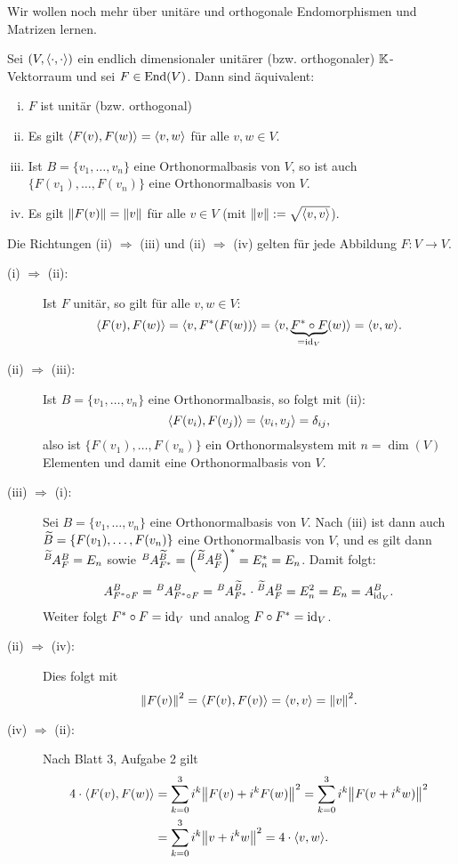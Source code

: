 Wir wollen noch mehr über unitäre und orthogonale Endomorphismen und Matrizen lernen.

\begin{satz}
	\label{satz:6.8}
	Sei $(V,\left\langle\cdot,\cdot\right\rangle)$ ein endlich dimensionaler unitärer (bzw. orthogonaler) $\mathbb{K}$-Vektorraum und sei $F \in \operatorname{End}(V)$.
	Dann sind äquivalent:
	\begin{enumerate}[(i)]
		\item $F$ ist unitär (bzw. orthogonal)
		\item Es gilt $\left\langle F(v),F(w)\right\rangle = \left\langle v,w\right\rangle$ für alle $v,w \in V$.
		\item Ist $B = \{v_1,\dots,v_n\}$ eine Orthonormalbasis von $V$, so ist auch $\{F(v_1),\dots,F(v_n)\}$ eine Orthonormalbasis von $V$.
		\item Es gilt $\left\lVert F(v)\right\rVert = \left\lVert v\right\rVert$ für alle $v \in V$ (mit $\left\lVert v\right\rVert := \sqrt{\left\langle v,v\right\rangle}$).
	\end{enumerate}
	Die Richtungen (ii) $\Rightarrow$ (iii) und (ii) $\Rightarrow$ (iv) gelten für jede Abbildung $F \colon V \rightarrow V$.
\end{satz}

\begin{beweis} 
	\begin{description}
		\item[(i) $\Rightarrow$ (ii):] Ist $F$ unitär, so gilt für alle $v,w \in V$:
		\[
			\sk{F(v),F(w)} = \sk{v,F^*(F(w))} = \langle v,\Underbrace{F^*\circ F}{\mathclap{=\id_V}}(w)\rangle = \sk{v,w}.
		\]
		\item[(ii) $\Rightarrow$ (iii):] Ist $B = \{v_1,\dots,v_n\}$ eine Orthonormalbasis, so folgt mit (ii):
		\[
			\left\langle F(v_i),F(v_j)\right\rangle = \left\langle v_i,v_j\right\rangle = \delta_{ij},
		\]
		also ist $\{F(v_1),\dots,F(v_n)\}$ ein Orthonormalsystem mit $n = \dim(V)$ Elementen und damit eine Orthonormalbasis von $V$.
		\item[(iii) $\Rightarrow$ (i):] Sei $B = \{v_1,\dots,v_n\}$ eine Orthonormalbasis von $V$.
		Nach (iii) ist dann auch $\widetilde{B} = \{F(v_1),\dots,F(v_n)\}$ eine Orthonormalbasis von $V$, und es gilt dann $\mat{A}{\wt{B}}{B}{F} = E_n$ sowie $\mat{A}{B}{\wt{B}}{F^*} = \enb{\mat{A}{\wt{B}}{B}{F}}^* = E_n^* = E_n$.
		Damit folgt:
		\[
			A^B_{F^* \circ F} = \mat{A}{B}{B}{F^* \circ F} = \mat{A}{B}{\wt{B}}{F^*} \cdot \mat{A}{\wt{B}}{B}{F} = E_n^2 = E_n = A^B_{\id_V}.
		\]
		Weiter folgt $F^* \circ F = \operatorname{id}_V$ und analog $F \circ F^* = \operatorname{id}_V$.
		\item[(ii) $\Rightarrow$ (iv):] Dies folgt mit
		\[
			\no{F(v)}^2 = \sk{F(v),F(v)} = \sk{v,v} = \no{v}^2.
		\]
		\item[(iv) $\Rightarrow$ (ii):] Nach Blatt 3, Aufgabe 2 gilt
		\begin{align*}
			4 \cdot \sk{F(v),F(w)} &= \sum_{k=0}^{3} i^k \no{F(v) + i^k F(w)}^2 
			= \sum_{k=0}^{3} i^k \no{F(v+i^kw)}^2 \\
			&= \sum_{k=0}^{3} i^k \no{v+i^kw}^2 = 4 \cdot \sk{v,w}. 
		\end{align*}
	\end{description}	
\end{beweis}

